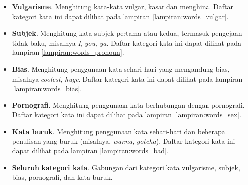 \begin{itemize}
\item \textbf{Vulgarisme}.
Menghitung kata-kata vulgar, kasar dan menghina.
Daftar kategori kata ini dapat dilihat pada lampiran
\ref{lampiran:words_vulgar}.

\item \textbf{Subjek}.
Menghitung kata subjek pertama atau kedua, termasuk pengejaan tidak baku,
misalnya \textit{I}, \textit{you}, \textit{ya}.
Daftar kategori kata ini dapat dilihat pada lampiran
\ref{lampiran:words_pronoun}.

\item \textbf{Bias}.
Menghitung penggunaan kata sehari-hari yang mengandung bias, misalnya
\textit{coolest}, \textit{huge}.
Daftar kategori kata ini dapat dilihat pada lampiran
\ref{lampiran:words_bias}.

\item \textbf{Pornografi}.
Menghitung penggunaan kata berhubungan dengan pornografi.
Daftar kategori kata ini dapat dilihat pada lampiran
\ref{lampiran:words_sex}.

\item \textbf{Kata buruk}.
Menghitung penggunaan kata sehari-hari dan beberapa penulisan yang buruk
(misalnya, \textit{wanna}, \textit{gotcha}).
Daftar kategori kata ini dapat dilihat pada lampiran
\ref{lampiran:words_bad}.

\item \textbf{Seluruh kategori kata}.
Gabungan dari kategori kata vulgarisme, subjek, bias, pornografi, dan kata
buruk.

\end{itemize}

